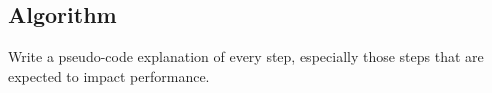 \documentclass[11pt]{article}
\renewcommand{\vec}[1]{\bm{#1}}
\begin{document}
\subsection{Algorithm}
Write a pseudo-code explanation of every step, especially those steps that are expected to impact performance. 
\end{document}
